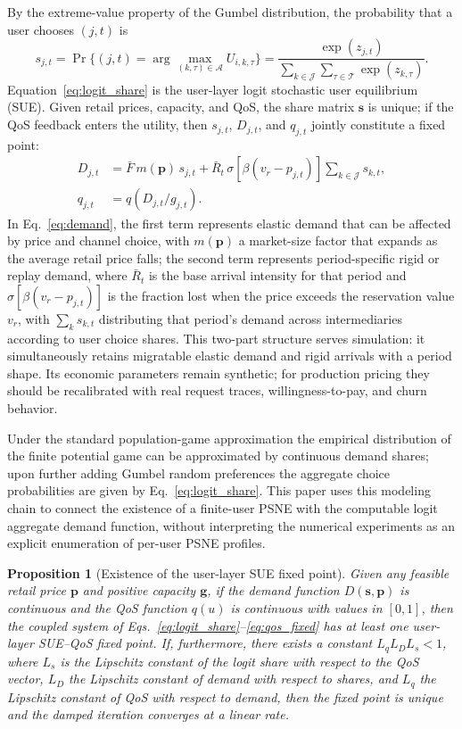 \documentclass[11pt,a4paper]{article}
\newtheorem{proposition}{Proposition}
\newcommand{\qos}{q}
\newcommand{\T}{\mathcal{T}}
\newcommand{\J}{\mathcal{J}}
\newcommand{\A}{\mathcal{A}}
\newcommand{\D}{D}
\newcommand{\p}{\boldsymbol{p}}
\newcommand{\g}{\boldsymbol{g}}
\begin{document}
By the extreme-value property of the Gumbel distribution, the probability that a user chooses $(j,t)$ is
\begin{equation}
  s_{j,t}=\Pr\{(j,t)=\arg\max_{(k,\tau)\in\A}U_{i,k,\tau}\}
  =\frac{\exp(z_{j,t})}{\sum_{k\in\J}\sum_{\tau\in\T}\exp(z_{k,\tau})}.
  \label{eq:logit_share}
\end{equation}
Equation~\eqref{eq:logit_share} is the user-layer logit stochastic user equilibrium (SUE). Given retail prices, capacity, and QoS, the share matrix $\boldsymbol{s}$ is unique; if the QoS feedback enters the utility, then $s_{j,t}$, $\D_{j,t}$, and $q_{j,t}$ jointly constitute a fixed point:
\begin{align}
  \D_{j,t}&=\bar F\,m(\p)\,s_{j,t}
  +\bar R_t\,\sigma[\beta(v_r-p_{j,t})]\sum_{k\in\J}s_{k,t}, \label{eq:demand}\\
  q_{j,t}&=\qos(\D_{j,t}/g_{j,t}). \label{eq:qos_fixed}
\end{align}
In Eq.~\eqref{eq:demand}, the first term represents elastic demand that can be affected by price and channel choice, with $m(\p)$ a market-size factor that expands as the average retail price falls; the second term represents period-specific rigid or replay demand, where $\bar R_t$ is the base arrival intensity for that period and $\sigma[\beta(v_r-p_{j,t})]$ is the fraction lost when the price exceeds the reservation value $v_r$, with $\sum_k s_{k,t}$ distributing that period's demand across intermediaries according to user choice shares. This two-part structure serves simulation: it simultaneously retains migratable elastic demand and rigid arrivals with a period shape. Its economic parameters remain synthetic; for production pricing they should be recalibrated with real request traces, willingness-to-pay, and churn behavior.

Under the standard population-game approximation the empirical distribution of the finite potential game can be approximated by continuous demand shares; upon further adding Gumbel random preferences the aggregate choice probabilities are given by Eq.~\eqref{eq:logit_share}. This paper uses this modeling chain to connect the existence of a finite-user PSNE with the computable logit aggregate demand function, without interpreting the numerical experiments as an explicit enumeration of per-user PSNE profiles.

\begin{proposition}[Existence of the user-layer SUE fixed point]
\label{prop:sue_fixed_point}
Given any feasible retail price $\p$ and positive capacity $\g$, if the demand function $\D(\boldsymbol{s},\p)$ is continuous and the QoS function $\qos(u)$ is continuous with values in $[0,1]$, then the coupled system of Eqs.~\eqref{eq:logit_share}--\eqref{eq:qos_fixed} has at least one user-layer SUE--QoS fixed point. If, furthermore, there exists a constant $L_\qos L_D L_s<1$, where $L_s$ is the Lipschitz constant of the logit share with respect to the QoS vector, $L_D$ the Lipschitz constant of demand with respect to shares, and $L_\qos$ the Lipschitz constant of QoS with respect to demand, then the fixed point is unique and the damped iteration converges at a linear rate.
\end{proposition}
\end{document}
